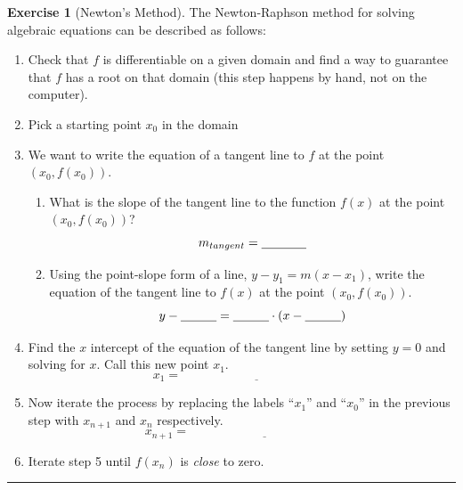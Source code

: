 \documentclass[
]{book}
\theoremstyle{definition}
\theoremstyle{definition}
\theoremstyle{definition}
\newtheorem{exercise}{Exercise}[chapter]
\theoremstyle{remark}
\begin{document}
\begin{exercise}[Newton's Method]
\protect\hypertarget{exr:newtons-method}{}{\label{exr:newtons-method} {} }The Newton-Raphson method for solving algebraic equations can be
described as follows:

\begin{enumerate}
\def\labelenumi{\arabic{enumi}.}
\item
  Check that \(f\) is differentiable on a given domain and find a way to
  guarantee that \(f\) has a root on that domain (this step happens by
  hand, not on the computer).
\item
  Pick a starting point \(x_0\) in the domain
\item
  We want to write the equation of a tangent line to \(f\) at the point
  \((x_0,  f(x_0))\).

  \begin{enumerate}
  \def\labelenumii{\roman{enumii}.}
  \item
    What is the slope of the tangent line to the function \(f(x)\) at
    the point \((x_0, f(x_0))\)?
    \[m_{tangent} = \underline{\hspace{0.5in}}\]
  \item
    Using the point-slope form of a line, \(y-y_1 = m(x-x_1)\), write
    the equation of the tangent line to \(f(x)\) at the point
    \((x_0, f(x_0))\).
    \[y - \underline{\hspace{0.4in}} = \underline{\hspace{0.4in}} \cdot \left(
                  x - \underline{\hspace{0.4in}} \right)\]
  \end{enumerate}
\item
  Find the \(x\) intercept of the equation of the tangent line by
  setting \(y=0\) and solving for \(x\). Call this new point \(x_1\).
  \[x_1 = \underline{\hspace{2in}}\]
\item
  Now iterate the process by replacing the labels ``\(x_1\)'' and ``\(x_0\)''
  in the previous step with \(x_{n+1}\) and \(x_{n}\) respectively.
  \[x_{n+1} = \underline{\hspace{2in}}\]
\item
  Iterate step 5 until \(f(x_{n})\) is \emph{close} to zero.
\end{enumerate}
\end{exercise}

\begin{center}\rule{0.5\linewidth}{0.5pt}\end{center}
\end{document}
